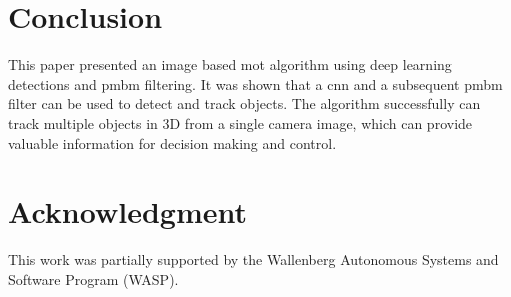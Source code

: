 \documentclass[conference]{IEEEtran}
\begin{document}
 
\section{Conclusion}
\label{sec:Conclusion}
This paper presented an image based \gls{mot} algorithm using deep learning detections and \gls{pmbm} filtering.
It was shown that a \gls{cnn} and a subsequent \gls{pmbm} filter can be used to detect and track objects.
The algorithm successfully can track multiple objects in 3D from a single camera image, which can provide valuable information for decision making and control.



 








\section*{Acknowledgment}
This work was partially supported by the Wallenberg Autonomous Systems and Software Program (WASP).

 












\end{document}
